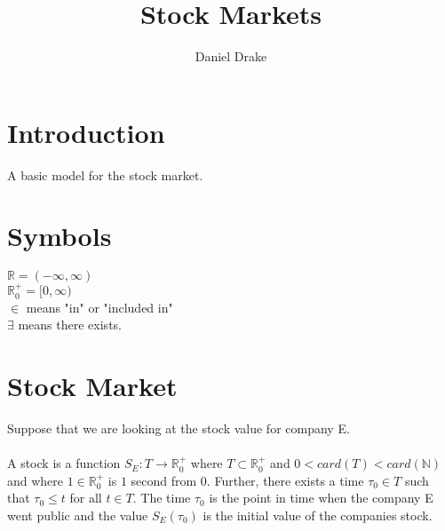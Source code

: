 \documentclass[12pt]{extarticle}
\title{Stock Markets}
\author{Daniel Drake}
\theoremstyle{plain}
\theoremstyle{Definition}
\theoremstyle{Definition}
\theoremstyle{plain}
\begin{document}
	\maketitle

	\section{Introduction}
	A basic model for the stock market. 
	
	\section{Symbols}
	$\mathbb{R} = (-\infty,\infty)$ \\ 
	$\mathbb{R}^+_0 = [0,\infty)$ \\
	$\in$ means "in" or "included in" \\
	$\exists$ means there exists.
	\section{Stock Market}
	Suppose that we are looking at the stock value for company E. \\ \\
	A stock is a function $S_E : T \to \mathbb{R}^+_0$ where $T \subset \mathbb{R}^+_0$ and $0 < card(T) < card(\mathbb{N})$ and where $1 \in \mathbb{R}^+_0$ is $1$ second from 0. 
	Further, there exists a time $\tau_0 \in T$ such that $\tau_0 \leq t$ for all $t \in T$. 
	The time $\tau_0$ is the point in time when the company E went public and the value $S_E(\tau_0)$ is the initial value of the companies stock. \\ \\
	
	


	
\end{document}
